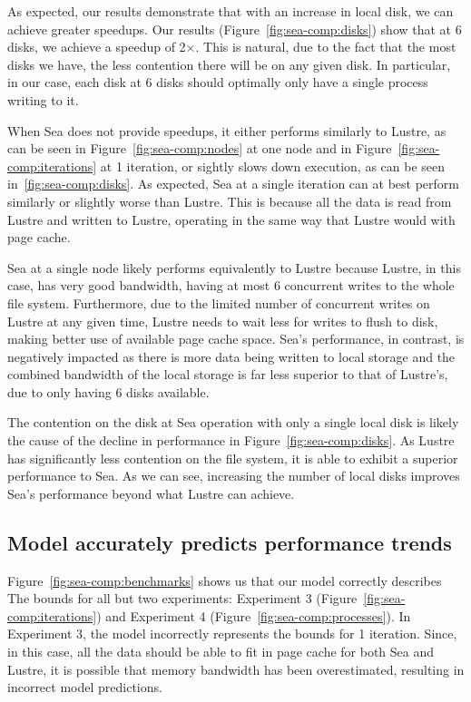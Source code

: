 \documentclass[10pt,journal,compsoc]{IEEEtran}
\begin{document}
      As expected, our results demonstrate that with an increase in local disk,
      we can achieve greater speedups. Our results
      (Figure~\ref{fig:sea-comp:disks}) show that at 6 disks, we achieve a
      speedup of 2$\times$. This is natural, due to the fact that the most disks
      we have, the less contention there will be on any given disk. In
      particular, in our case, each disk at 6 disks should optimally only have a
      single process writing to it.

      When Sea does not provide speedups, it either performs similarly to
      Lustre, as can be seen in Figure~\ref{fig:sea-comp:nodes} at one node and in
      Figure~\ref{fig:sea-comp:iterations} at 1 iteration, or sightly slows down
      execution, as can be seen in~\ref{fig:sea-comp:disks}. As expected, Sea at
      a single iteration can at best perform similarly or slightly worse than
      Lustre. This is because all the data is read from Lustre and written to
      Lustre, operating in the same way that Lustre would with page cache.

      Sea at a single node likely performs equivalently to Lustre because
      Lustre, in this case, has very good bandwidth, having at most 6 concurrent
      writes to the whole file system. Furthermore, due to the limited number of
      concurrent writes on Lustre at any given time, Lustre needs to wait less
      for writes to flush to disk, making better use of available page cache
      space. Sea's performance, in contrast, is negatively impacted as there is
      more data being written to local storage and the combined bandwidth of the
      local storage is far less superior to that of Lustre's, due to only having
      6 disks available.

      The contention on the disk at Sea operation with only a single local disk
      is likely the cause of the decline in performance in
      Figure~\ref{fig:sea-comp:disks}. As Lustre has significantly less
      contention on the file system, it is able to exhibit a superior
      performance to Sea. As we can see, increasing the number of local disks
      improves Sea's performance beyond what Lustre can achieve.
    

      \subsection{Model accurately predicts performance trends}

      Figure~\ref{fig:sea-comp:benchmarks} shows us that our model correctly describes The
      bounds for all but two experiments: Experiment 3
      (Figure~\ref{fig:sea-comp:iterations}) and Experiment 4
      (Figure~\ref{fig:sea-comp:processes}). In Experiment 3, the model
      incorrectly represents the bounds for 1 iteration. Since, in this case, all
      the data should be able to fit in page cache for both Sea and Lustre, it
      is possible that memory bandwidth has been overestimated, resulting in
      incorrect model predictions.
\end{document}
